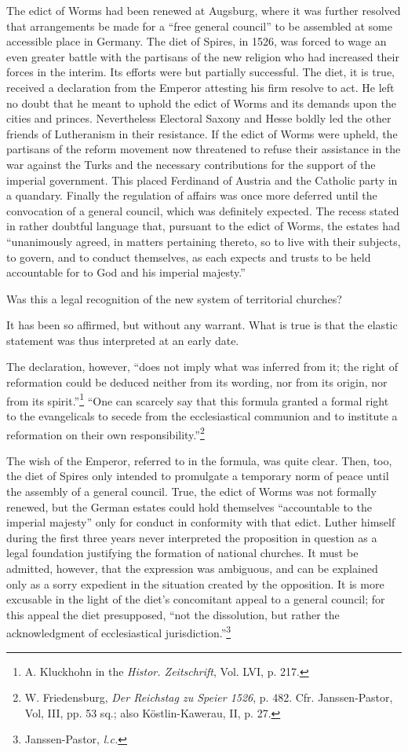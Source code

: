 The edict of Worms had been renewed at Augsburg, where it was
further resolved that arrangements be made for a “free general council”
to be assembled at some accessible place in Germany. The diet
of Spires, in 1526, was forced to wage an even greater battle with
the partisans of the new religion who had increased their forces in
the interim. Its efforts were but partially successful. The diet, it is
true, received a declaration from the Emperor attesting his firm
resolve to act. He left no doubt that he meant to uphold the edict
of Worms and its demands upon the cities and princes. Nevertheless
Electoral Saxony and Hesse boldly led the other friends of Lutheranism
in their resistance. If the edict of Worms were upheld, the
partisans of the reform movement now threatened to refuse their
assistance in the war against the Turks and the necessary contributions
for the support of the imperial government. This placed
Ferdinand of Austria and the Catholic party in a quandary. Finally
the regulation of affairs was once more deferred until the convocation
of a general council, which was definitely expected. The recess
stated in rather doubtful language that, pursuant to the edict of
Worms, the estates had “unanimously agreed, in matters pertaining
thereto, so to live with their subjects, to govern, and to conduct
themselves, as each expects and trusts to be held accountable for to
God and his imperial majesty.”

Was this a legal recognition of the new system of territorial
churches?

It has been so affirmed, but without any warrant. What is true is
that the elastic statement was thus interpreted at an early date.

The declaration, however, “does not imply what was inferred from it; the
right of reformation could be deduced neither from its wording, nor from
its origin, nor from its spirit.”\footnote{A. Kluckhohn in the \textit{Histor. Zeitschrift}, Vol. LVI, p. 217.}
 “One can scarcely say that this formula
granted a formal right to the evangelicals to secede from the ecclesiastical
communion and to institute a reformation on their own responsibility.”\footnote{W. Friedensburg, \textit{Der Reichstag zu Speier 1526}, p. 482. Cfr. Janssen-Pastor, Vol, III,
pp. 53 sq.; also Köstlin-Kawerau, II, p. 27.}

The wish of the Emperor, referred to in the formula, was quite clear. Then,
too, the diet of Spires only intended to promulgate a temporary norm of peace
until the assembly of a general council. True, the edict of Worms was not
formally renewed, but the German estates could hold themselves “accountable
to the imperial majesty” only for conduct in conformity with that edict.
Luther himself during the first three years never interpreted the proposition
in question as a legal foundation justifying the formation of national
churches. It must be admitted, however, that the expression was ambiguous,
and can be explained only as a sorry expedient in the situation created by
the opposition. It is more excusable in the light of the diet’s concomitant
appeal to a general council; for this appeal the diet presupposed, “not the
dissolution, but rather the acknowledgment of ecclesiastical jurisdiction.”\footnote{Janssen-Pastor, \textit{l.c.}}

